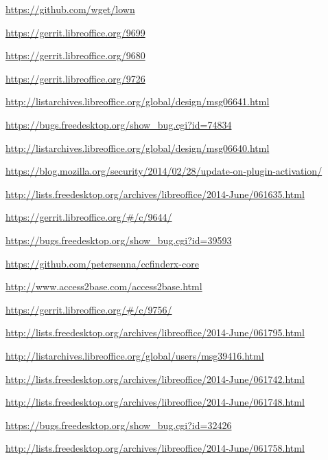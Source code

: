 \documentclass{article}
\begin{document}
\begin{thebibliography}{30}

\url{https://github.com/wget/lown}

\url{https://gerrit.libreoffice.org/9699}

\url{https://gerrit.libreoffice.org/9680}

\url{https://gerrit.libreoffice.org/9726}

\url{http://listarchives.libreoffice.org/global/design/msg06641.html}

\url{https://bugs.freedesktop.org/show_bug.cgi?id=74834}

\url{http://listarchives.libreoffice.org/global/design/msg06640.html}

\url{https://blog.mozilla.org/security/2014/02/28/update-on-plugin-activation/}

\url{http://lists.freedesktop.org/archives/libreoffice/2014-June/061635.html}

\url{https://gerrit.libreoffice.org/#/c/9644/}

\url{https://bugs.freedesktop.org/show_bug.cgi?id=39593}

\url{https://github.com/petersenna/ccfinderx-core}

\url{http://www.access2base.com/access2base.html}

\url{https://gerrit.libreoffice.org/#/c/9756/}

\url{http://lists.freedesktop.org/archives/libreoffice/2014-June/061795.html}

\url{http://listarchives.libreoffice.org/global/users/msg39416.html}

\url{http://lists.freedesktop.org/archives/libreoffice/2014-June/061742.html}

\url{http://lists.freedesktop.org/archives/libreoffice/2014-June/061748.html}

\url{https://bugs.freedesktop.org/show_bug.cgi?id=32426}

\url{http://lists.freedesktop.org/archives/libreoffice/2014-June/061758.html}


\end{thebibliography}
\end{document}
